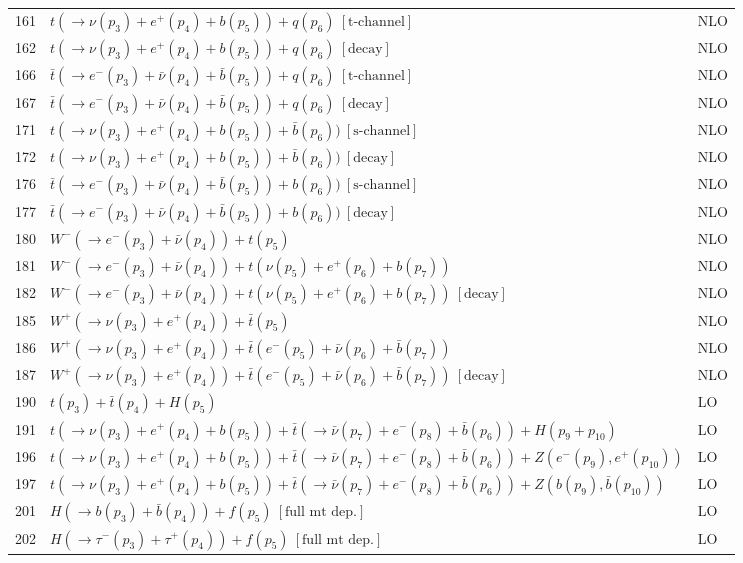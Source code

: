 \documentclass[12pt]{article}
\begin{document}
\begin{itemize}
\begin{table}
\begin{center}
\begin{tabular}{|l|l|l|}
\hline 
161& $ t(\to \nu(p_3)+e^+(p_4)+b(p_5))+q(p_6) ~[ \mbox{t-channel} ] $ & NLO \\
162& $ t(\to \nu(p_3)+e^+(p_4)+b(p_5))+q(p_6) ~[ \mbox{decay} ] $ & NLO \\
166& $ \bar{t}(\to e^-(p_3)+\bar{\nu}(p_4)+\bar{b}(p_5))+q(p_6) ~[ \mbox{t-channel} ] $ & NLO \\
167& $ \bar{t}(\to e^-(p_3)+\bar{\nu}(p_4)+\bar{b}(p_5))+q(p_6) ~[ \mbox{decay} ] $ & NLO \\
\hline 
171& $ t(\to \nu(p_3)+e^+(p_4)+b(p_5))+\bar{b}(p_6)) ~[ \mbox{s-channel} ] $ & NLO \\
172& $ t(\to \nu(p_3)+e^+(p_4)+b(p_5))+\bar{b}(p_6)) ~[ \mbox{decay} ] $ & NLO \\
176& $ \bar{t}(\to e^-(p_3)+\bar{\nu}(p_4)+\bar{b}(p_5))+b(p_6)) ~[ \mbox{s-channel} ] $ & NLO \\
177& $ \bar{t}(\to e^-(p_3)+\bar{\nu}(p_4)+\bar{b}(p_5))+b(p_6)) ~[ \mbox{decay} ] $ & NLO \\
\hline 
180& $ W^-(\to e^-(p_3)+\bar{\nu}(p_4))+t(p_5) $ & NLO \\
181& $ W^-(\to e^-(p_3)+\bar{\nu}(p_4))+t(\nu(p_5)+e^+(p_6)+b(p_7)) $ & NLO \\
182& $ W^-(\to e^-(p_3)+\bar{\nu}(p_4))+t(\nu(p_5)+e^+(p_6)+b(p_7)) ~[ \mbox{decay} ] $ & NLO \\
185& $ W^+(\to \nu(p_3)+e^+(p_4))+\bar{t}(p_5) $ & NLO \\
186& $ W^+(\to \nu(p_3)+e^+(p_4))+\bar{t}(e^-(p_5)+\bar{\nu}(p_6)+\bar{b}(p_7)) $ & NLO \\
187& $ W^+(\to \nu(p_3)+e^+(p_4))+\bar{t}(e^-(p_5)+\bar{\nu}(p_6)+\bar{b}(p_7)) ~[ \mbox {decay} ] $ & NLO \\
\hline 
190& $t(p_3)+\bar{t}(p_4)+H(p_5) $ & LO \\
191& $ t(\to \nu(p_3)+e^+(p_4)+b(p_5))+\bar{t}(\to \bar{\nu}(p_7)+e^-(p_8)+\bar{b}(p_6))+H(p_9+p_{10}) $ & LO \\
\hline 
196& $ t(\to \nu(p_3)+e^+(p_4)+b(p_5))+\bar{t}(\to \bar{\nu}(p_7)+e^-(p_8)+\bar{b}(p_6))+Z(e^-(p_9),e^+(p_{10})) $ & LO \\
197& $ t(\to \nu(p_3)+e^+(p_4)+b(p_5))+\bar{t}(\to \bar{\nu}(p_7)+e^-(p_8)+\bar{b}(p_6))+Z(b(p_9),\bar{b}(p_{10})) $ & LO \\
\hline 
201& $ H(\to b(p_3)+\bar{b}(p_4)) + f(p_5) ~[ \mbox{full mt dep.} ] $ & LO \\
202& $ H(\to \tau^-(p_3)+\tau^+(p_4)) + f(p_5) ~[ \mbox{full mt dep.} ] $ & LO \\

\end{tabular}
\end{center}
\end{table}
\end{itemize}
\end{document}
